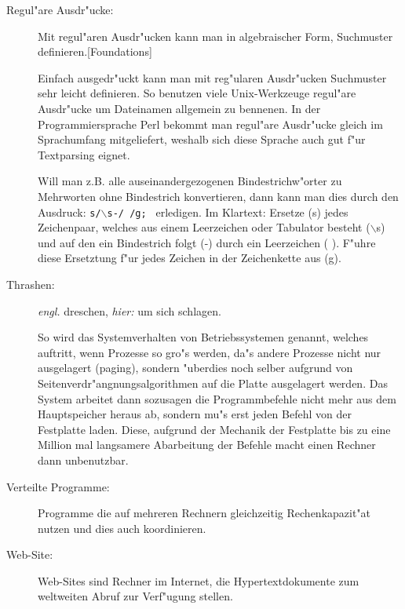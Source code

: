 \begin{description}
\item[Regul"are Ausdr"ucke:]	Mit regul"aren Ausdr"ucken kann man in algebraischer Form, Suchmuster definieren.[Foundations]

Einfach ausgedr"uckt kann man mit reg"ularen Ausdr"ucken Suchmuster sehr leicht definieren. So benutzen viele Unix-Werkzeuge regul"are Ausdr"ucke um Dateinamen allgemein zu bennenen. In der Programmiersprache Perl bekommt man regul"are Ausdr"ucke gleich im Sprachumfang mitgeliefert, weshalb sich diese Sprache auch gut f"ur Textparsing eignet.

Will man z.B. alle auseinandergezogenen Bindestrichw"orter zu Mehrworten ohne Bindestrich konvertieren, dann kann man dies durch den Ausdruck:
\nl 
{\tt s/$\backslash$s-/ /g;	\nl
}
erledigen. Im Klartext: Ersetze (s) jedes Zeichenpaar, welches aus einem Leerzeichen oder Tabulator besteht ($\backslash$s) und auf den ein Bindestrich folgt (-) durch ein Leerzeichen ( ). F"uhre diese Ersetztung f"ur jedes Zeichen in der Zeichenkette aus (g).


\item[Thrashen:] {\em engl.} dreschen, {\em hier:} um sich schlagen. 

So wird das Systemverhalten von Betriebssystemen genannt, welches auftritt, wenn Prozesse so gro"s werden, da"s andere Prozesse nicht nur ausgelagert (paging), sondern "uberdies noch selber aufgrund von Seitenverdr"angnungsalgorithmen auf die Platte ausgelagert werden. Das System arbeitet dann sozusagen die Programmbefehle nicht mehr aus dem Hauptspeicher heraus ab, sondern mu"s erst jeden Befehl von der Festplatte laden. Diese, aufgrund der Mechanik der Festplatte bis zu eine Million mal langsamere Abarbeitung der Befehle macht einen Rechner dann unbenutzbar.\cite{Denning1968}


\item[Verteilte Programme:] Programme die auf mehreren Rechnern gleichzeitig Rechenkapazit"at nutzen und dies auch koordinieren.



\item[Web-Site:] Web-Sites sind Rechner im Internet, die Hypertextdokumente zum weltweiten Abruf zur Verf"ugung stellen.
\end{description}
